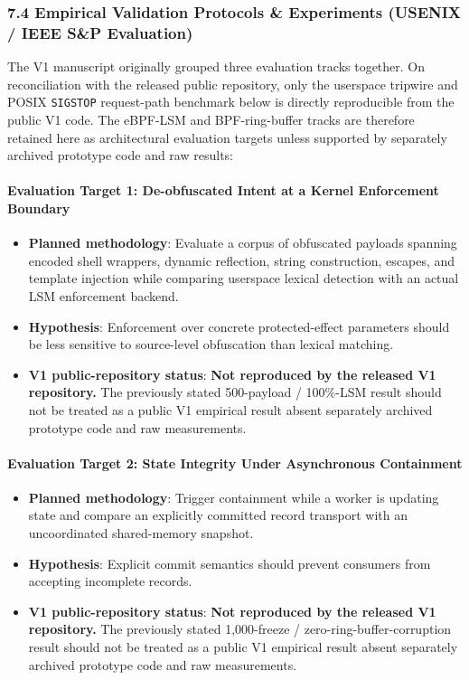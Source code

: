 \documentclass[
  10pt,letterpaper]{article}
\providecommand{\tightlist}{%
  \setlength{\itemsep}{0pt}\setlength{\parskip}{0pt}}
\begin{document}
\subsubsection{7.4 Empirical Validation Protocols \& Experiments (USENIX
/ IEEE S\&P
Evaluation)}\label{empirical-validation-protocols-experiments-usenix-ieee-sp-evaluation}

The V1 manuscript originally grouped three evaluation tracks together. On
reconciliation with the released public repository, only the userspace
tripwire and POSIX \texttt{SIGSTOP} request-path benchmark below is directly
reproducible from the public V1 code. The eBPF-LSM and BPF-ring-buffer tracks
are therefore retained here as architectural evaluation targets unless
supported by separately archived prototype code and raw results:

\paragraph{Evaluation Target 1: De-obfuscated Intent at a Kernel Enforcement Boundary}

\begin{itemize}
\tightlist
\item \textbf{Planned methodology}: Evaluate a corpus of obfuscated payloads
spanning encoded shell wrappers, dynamic reflection, string construction,
escapes, and template injection while comparing userspace lexical detection
with an actual LSM enforcement backend.
\item \textbf{Hypothesis}: Enforcement over concrete protected-effect
parameters should be less sensitive to source-level obfuscation than lexical
matching.
\item \textbf{V1 public-repository status}: \textbf{Not reproduced by the
released V1 repository.} The previously stated 500-payload / 100\%-LSM result
should not be treated as a public V1 empirical result absent separately
archived prototype code and raw measurements.
\end{itemize}

\paragraph{Evaluation Target 2: State Integrity Under Asynchronous Containment}

\begin{itemize}
\tightlist
\item \textbf{Planned methodology}: Trigger containment while a worker is
updating state and compare an explicitly committed record transport with an
uncoordinated shared-memory snapshot.
\item \textbf{Hypothesis}: Explicit commit semantics should prevent consumers
from accepting incomplete records.
\item \textbf{V1 public-repository status}: \textbf{Not reproduced by the
released V1 repository.} The previously stated 1,000-freeze /
zero-ring-buffer-corruption result should not be treated as a public V1
empirical result absent separately archived prototype code and raw measurements.
\end{itemize}
\end{document}
